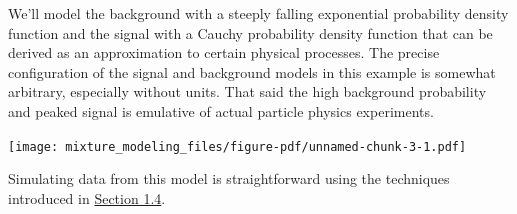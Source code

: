 \documentclass[
  letterpaper,
  DIV=11,
  numbers=noendperiod]{scrartcl}
\newenvironment{Shaded}{\begin{snugshade}}{\end{snugshade}}
\newcommand{\AttributeTok}[1]{\textcolor[rgb]{0.40,0.45,0.13}{#1}}
\newcommand{\DecValTok}[1]{\textcolor[rgb]{0.68,0.00,0.00}{#1}}
\newcommand{\FloatTok}[1]{\textcolor[rgb]{0.68,0.00,0.00}{#1}}
\newcommand{\FunctionTok}[1]{\textcolor[rgb]{0.28,0.35,0.67}{#1}}
\newcommand{\NormalTok}[1]{\textcolor[rgb]{0.00,0.23,0.31}{#1}}
\newcommand{\OtherTok}[1]{\textcolor[rgb]{0.00,0.23,0.31}{#1}}
\newcommand{\SpecialCharTok}[1]{\textcolor[rgb]{0.37,0.37,0.37}{#1}}
\newcommand{\StringTok}[1]{\textcolor[rgb]{0.13,0.47,0.30}{#1}}
\begin{document}
We'll model the background with a steeply falling exponential
probability density function and the signal with a Cauchy probability
density function that can be derived as an approximation to certain
physical processes. The precise configuration of the signal and
background models in this example is somewhat arbitrary, especially
without units. That said the high background probability and peaked
signal is emulative of actual particle physics experiments.

\begin{Shaded}
\end{Shaded}

\texttt{[image: mixture\_modeling\_files/figure-pdf/unnamed-chunk-3-1.pdf]}

Simulating data from this model is straightforward using the techniques
introduced in \hyperref[sec:sampling]{Section 1.4}.
\end{document}
